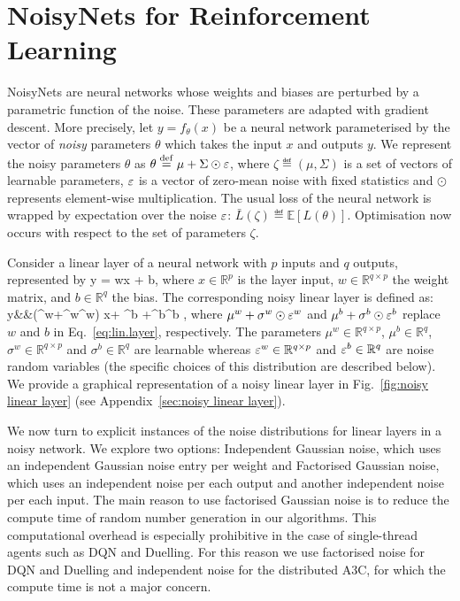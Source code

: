 \documentclass{article}
\begin{document}
\section{NoisyNets for Reinforcement Learning}
\label{sec:noisynets}

NoisyNets are neural networks whose weights and biases are perturbed by a parametric function of the noise. These parameters are adapted with gradient descent. More precisely, let $y=f_\theta(x)$ be a neural network parameterised by the vector of \emph{noisy} parameters $\theta$ which takes the input $x$ and outputs $y$.  We represent the noisy parameters $\theta$ as $\theta \stackrel{\rm def}{=} \mu +\Sigma\odot\varepsilon$, where  $\zeta\eqdef(\mu,\Sigma)$ is a set of vectors of learnable parameters, $\varepsilon$ is a vector of zero-mean noise with fixed statistics and  $\odot$ represents element-wise multiplication. The usual loss of the neural network is wrapped by expectation over the noise $\varepsilon$: $\bar L(\zeta) \eqdef \mathbb{E}\left[L(\theta)\right]$. Optimisation now occurs with respect to the set of parameters $\zeta$.

Consider a linear layer of a neural network with $p$ inputs and $q$ outputs, represented by 
\beq
\label{eq:lin.layer}
y = wx + b,
\eeq
where $x\in \mathbb{R}^{p}$ is the layer input, $w\in\mathbb{R}^{q\times p}$ the weight matrix, and $b\in\mathbb{R}^q$ the bias.
The corresponding noisy linear layer is defined as:
\beqa
\label{eq:param}
y&\eqdef&(\mu^w+\sigma^w\odot\eps^w) x+ \mu^b  +\sigma^b\odot\eps^b ,
\eeqa
 where  $\mu^w+\sigma^w\odot\varepsilon^w$ and $\mu^b  +\sigma^b\odot\varepsilon^b$ replace $w$ and $b$ in Eq.~\eqref{eq:lin.layer}, respectively.  The parameters $\mu^w\in \mathbb{R}^{q\times p}$, $\mu^b\in \mathbb{R}^{q}$, $\sigma^w\in \mathbb{R}^{q\times p}$ and $\sigma^b\in \mathbb{R}^{q}$ are learnable whereas $\varepsilon^w\in \mathbb{R}^{q\times p}$  and $\varepsilon^b\in \mathbb{R}^{q}$ are noise random variables (the specific choices of this distribution are described below). We provide a graphical representation of a noisy linear layer in Fig.~\ref{fig:noisy linear layer} (see Appendix~\ref{sec:noisy linear layer}). 

We now turn to explicit instances of the noise distributions for linear layers in a noisy network. We explore two options: Independent Gaussian noise, which uses an independent Gaussian noise entry per weight and Factorised Gaussian noise, which uses an independent noise per each output and another independent noise per each input. The main reason to use factorised Gaussian noise is to reduce the compute time of random number generation in our algorithms. This computational overhead is especially prohibitive in the case of single-thread agents such as DQN and Duelling. For this reason we use factorised noise for DQN and Duelling and independent noise for the distributed A3C, for which the compute time is not a major concern.
\end{document}
